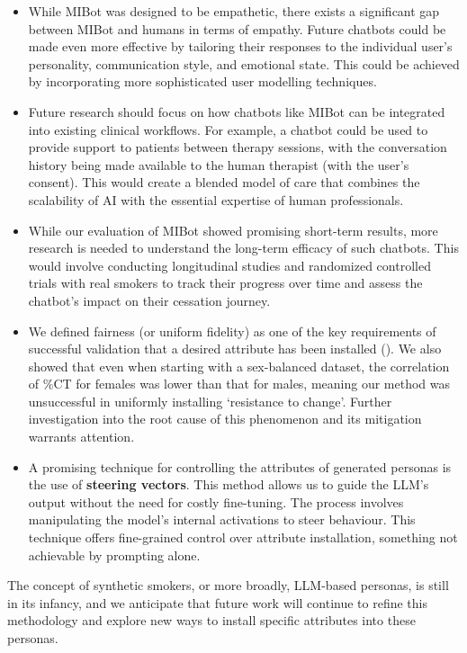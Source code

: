 \begin{itemize}
    \item While MIBot was designed to be empathetic, there exists a significant gap between MIBot and humans in terms of empathy. Future chatbots could be made even more effective by tailoring their responses to the individual user's personality, communication style, and emotional state. This could be achieved by incorporating more sophisticated user modelling techniques.
    \item Future research should focus on how chatbots like MIBot can be integrated into existing clinical workflows. For example, a chatbot could be used to provide support to patients between therapy sessions, with the conversation history being made available to the human therapist (with the user's consent). This would create a blended model of care that combines the scalability of AI with the essential expertise of human professionals.
    \item While our evaluation of MIBot showed promising short-term results, more research is needed to understand the long-term efficacy of such chatbots. This would involve conducting longitudinal studies and randomized controlled trials with real smokers to track their progress over time and assess the chatbot's impact on their cessation journey.
    \item  We defined fairness (or uniform fidelity) as one of the key requirements of successful validation that a desired attribute has been installed (). We also showed that even when starting with a sex-balanced dataset, the correlation of \%CT for females was lower than that for males, meaning our method was unsuccessful in uniformly installing `resistance to change'. Further investigation into the root cause of this phenomenon and its mitigation warrants attention.
    \item A promising technique for controlling the attributes of generated personas is the use of \textbf{steering vectors}. This method allows us to guide the LLM's output without the need for costly fine-tuning. The process involves manipulating the model's internal activations to steer behaviour. This technique offers fine-grained control over attribute installation, something not achievable by prompting alone.
\end{itemize}

The concept of synthetic smokers, or more broadly, LLM-based personas, is still in its infancy, and we anticipate that future work will continue to refine this methodology and explore new ways to install specific attributes into these personas.

